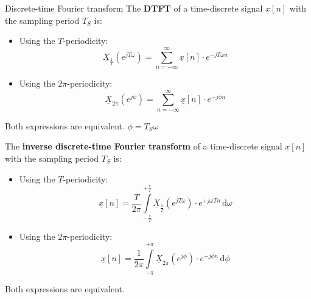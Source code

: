 \begin{refsection}
\begin{definition}{Discrete-time Fourier transform}
	The  \textbf{\acf{DTFT}} of a time-discrete signal $\underline{x}[n]$ with the sampling period $T_S$ is:
	\begin{itemize}
		\item Using the $T$-periodicity:
		\begin{equation}
			\underline{X}_{\frac{1}{T}} \left(e^{j T \omega}\right) = \sum\limits_{n = -\infty}^{\infty} \underline{x}[n] \cdot e^{-j T \omega n}
		\end{equation}
		\item Using the $2 \pi$-periodicity:
		\begin{equation}
			\underline{X}_{2 \pi} \left(e^{j \phi}\right) = \sum\limits_{n = -\infty}^{\infty} \underline{x}[n] \cdot e^{-j \phi n}
		\end{equation}
	\end{itemize}
	Both expressions are equivalent. $\phi = T_S \omega$
	
	The  \textbf{inverse discrete-time Fourier transform} of a time-discrete signal $\underline{x}[n]$ with the sampling period $T_S$ is:
	\begin{itemize}
		\item Using the $T$-periodicity: 
		\begin{equation}
			\underline{x}[n] = \frac{T}{2 \pi} \int\limits_{- \frac{\pi}{T}}^{+ \frac{\pi}{T}} \underline{X}_{\frac{1}{T}}(e^{j T \omega}) \cdot e^{+ j \omega T n} \, \mathrm{d} \omega
		\end{equation}
		\item Using the $2 \pi$-periodicity:
		\begin{equation}
			\underline{x}[n] = \frac{1}{2 \pi} \int\limits_{- \pi}^{+ \pi} \underline{X}_{2\pi}(e^{j \phi}) \cdot e^{+ j \phi n} \, \mathrm{d} \phi
		\end{equation}
	\end{itemize}
	Both expressions are equivalent.
\end{definition}


\end{refsection}

